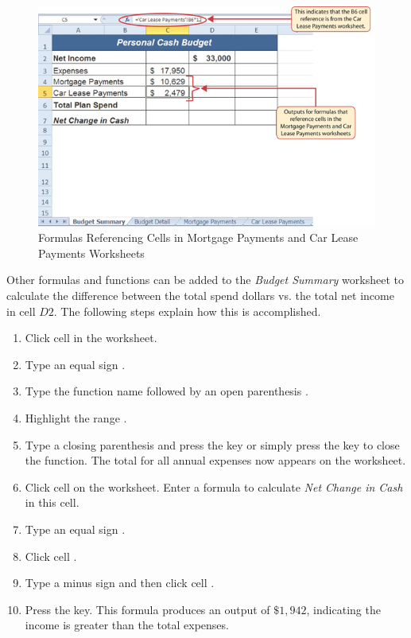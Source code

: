 \begin{figure}[H]
	\centering
	\includegraphics[width=\maxwidth{.95\linewidth}]{gfx/ch02_fig37}
	\caption{Formulas Referencing Cells in Mortgage Payments and Car Lease Payments Worksheets}
	\label{02:fig37}
\end{figure}

Other formulas and functions can be added to the \textit{Budget Summary} worksheet to calculate the difference between the total spend dollars vs. the total net income in cell $ D2 $. The following steps explain how this is accomplished.

\begin{enumerate}
	\item Click cell  in the  worksheet.
	\item Type an equal sign \fmtTyping{=}.
	\item Type the function name  followed by an open parenthesis \fmtTyping{(}.
	\item Highlight the range .
	\item Type a closing parenthesis \fmtTyping{)} and press the  key or simply press the  key to close the function. The total for all annual expenses now appears on the worksheet.
	\item Click cell  on the  worksheet. Enter a formula to calculate \textit{Net Change in Cash} in this cell.
	\item Type an equal sign \fmtTyping{=}.
	\item Click cell .
	\item Type a minus sign \fmtTyping{-} and then click cell .
	\item Press the  key. This formula produces an output of $ \$1,942 $, indicating the income is greater than the total expenses.
\end{enumerate}

